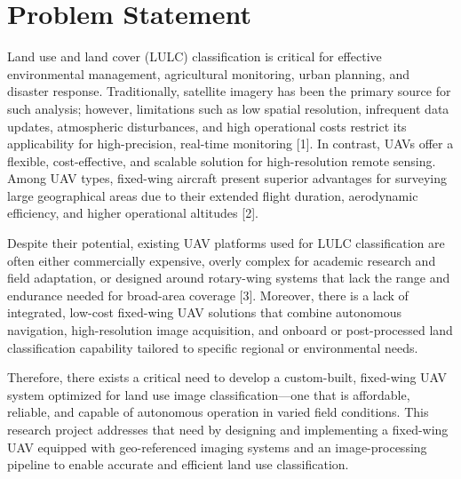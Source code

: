 \section{Problem Statement}
Land use and land cover (LULC) classification is critical for effective environmental management, agricultural monitoring, urban planning, and disaster response. Traditionally, satellite imagery has been the primary source for such analysis; however, limitations such as low spatial resolution, infrequent data updates, atmospheric disturbances, and high operational costs restrict its applicability for high-precision, real-time monitoring [1]. In contrast, UAVs offer a flexible, cost-effective, and scalable solution for high-resolution remote sensing. Among UAV types, fixed-wing aircraft present superior advantages for surveying large geographical areas due to their extended flight duration, aerodynamic efficiency, and higher operational altitudes [2].

Despite their potential, existing UAV platforms used for LULC classification are often either commercially expensive, overly complex for academic research and field adaptation, or designed around rotary-wing systems that lack the range and endurance needed for broad-area coverage [3]. Moreover, there is a lack of integrated, low-cost fixed-wing UAV solutions that combine autonomous navigation, high-resolution image acquisition, and onboard or post-processed land classification capability tailored to specific regional or environmental needs.

Therefore, there exists a critical need to develop a custom-built, fixed-wing UAV system optimized for land use image classification—one that is affordable, reliable, and capable of autonomous operation in varied field conditions. This research project addresses that need by designing and implementing a fixed-wing UAV equipped with geo-referenced imaging systems and an image-processing pipeline to enable accurate and efficient land use classification.